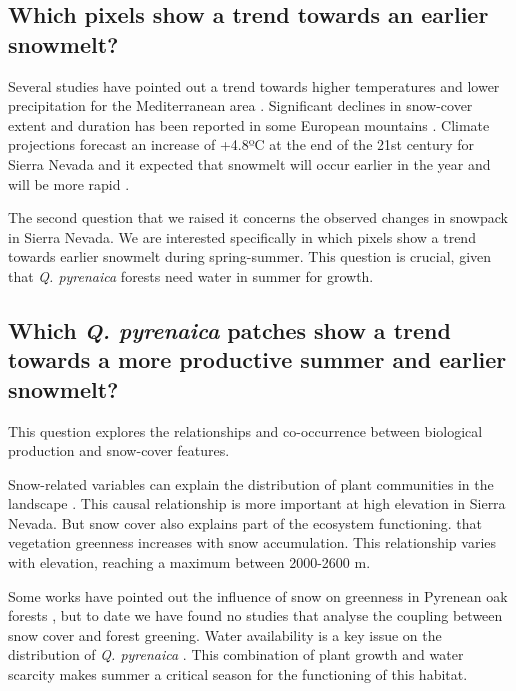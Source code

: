 \subsection{Which pixels show a trend towards an earlier snowmelt?}\label{sec:onto:Snowmelt}

Several studies have pointed out a trend towards higher temperatures and lower precipitation for the Mediterranean area \autocite{GarciaRuizetal2011MediterraneanWater,GiorgiLionello2008ClimateChange}. Significant declines in snow-cover extent and duration has been reported in some European mountains \autocite{Marty2008RegimeShift,MorenoRodriguezetal2005EvaluacionPreliminar,Nikolovaetal2013ChangesSnowfall,Scherreretal2004TrendsSwiss}. Climate projections forecast an increase of +4.8ºC at the end of the 21st century \autocite{Benitoetal2011SimulatingPotential} for Sierra Nevada and it expected that snowmelt will occur earlier in the year and will be more rapid \autocite{GarciaRuizetal2011MediterraneanWater}.

The second question that we raised it concerns the observed changes in snowpack in Sierra Nevada. We are interested specifically in which pixels show a trend towards earlier snowmelt during spring-summer. This question is crucial, given that \emph{Q. pyrenaica} forests need water in summer for growth.

\subsection{Which \emph{Q. pyrenaica} patches show a trend towards a more productive summer and earlier snowmelt?}\label{sec:ontoProductive}

This question explores the relationships and co-occurrence between biological production and snow-cover features.

Snow-related variables can explain the distribution of plant communities in the landscape \autocite{Jonesetal2001SnowEcology}. This causal relationship is more important at high elevation \autocite{BonetGarciaCayuela2009SeguimientoCubierta} in Sierra Nevada. But snow cover also explains part of the ecosystem functioning. \textcite{Trujilloetal2012ElevationdependentInfluence} that vegetation greenness increases with snow accumulation. This relationship varies with elevation, reaching a maximum between 2000-2600 m.

Some works have pointed out the influence of snow on greenness in Pyrenean oak forests \autocite{AlcarazSeguraetal2009BaselineCharacterization,Dionisioetal2012SatelliteBasedMonitoring}, but to date we have found no studies that analyse the coupling between snow cover and forest greening. Water availability is a key issue on the distribution of \emph{Q. pyrenaica} \autocite{delRioetal2007BioclimaticAnalysis,Gavilanetal2007ModellingCurrent}. This combination of plant growth and water scarcity makes summer a critical season for the functioning of this habitat.

